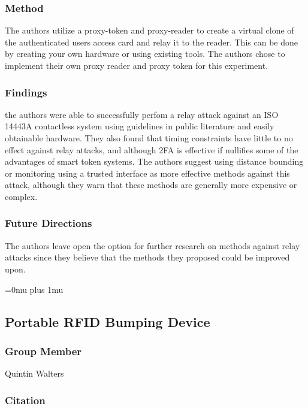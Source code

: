 \subsubsection{Method}

\noindent
The authors utilize a proxy-token and proxy-reader to create a virtual clone of the authenticated users access card and relay it to the reader. This can be done by creating your own hardware or using existing tools. The authors chose to implement their own proxy reader and proxy token for this experiment.

\subsubsection{Findings}

\noindent
the authors were able to successfully perfom a relay attack against an ISO 14443A contactless system using guidelines in public literature and easily obtainable hardware. They also found that timing constraints have little to no effect against relay attacks, and although 2FA is effective if nullifies some of the advantages of smart token systems. The authors suggest using distance bounding or monitoring using a trusted interface as more effective methods against this attack, although they warn that these methods are generally more expensive or complex. 

\subsubsection{Future Directions}

\noindent
The authors leave open the option for further research on methods against relay attacks since they believe that the methods they proposed could be improved upon.

\Urlmuskip=0mu plus 1mu\relax

\noindent
\subsection{Portable RFID Bumping Device}

\subsubsection{Group Member}

\noindent
Quintin Walters

\noindent
\subsubsection{Citation}

